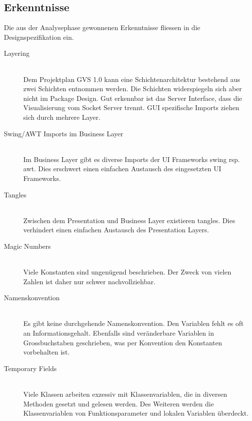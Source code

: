 \documentclass[11pt,a4paper,english,oneside]{book}
\numberwithin{equation}{chapter}
\begin{document}
	\clearpage
	
	\subsection{Erkenntnisse} \label{sec:erkenntnisse}
	Die aus der Analysephase gewonnenen Erkenntnisse fliessen in die Designspezifikation ein.
		
	\begin{description}
	\item[Layering] \hfill \\
	Dem Projektplan GVS 1.0 \cite{gvs1} kann eine Schichtenarchitektur bestehend aus zwei Schichten entnommen werden. Die Schichten widerspiegeln sich aber nicht im Package Design. Gut erkennbar ist das Server Interface, dass die Visualisierung vom Socket Server trennt. GUI spezifische Imports ziehen sich durch mehrere Layer.
	
	\item[Swing/AWT Imports im Business Layer] \hfill \\ \label{sssec:swing-business}
	Im Business Layer gibt es diverse Imports der UI Frameworks \gls{swing} rsp. \gls{awt}. Dies erschwert einen einfachen Austausch des eingesetzten UI Frameworks.
	
	\item[Tangles] \hfill \\
	Zwischen dem Presentation und Business Layer existieren \glspl{tangle}. Dies verhindert einen einfachen Austausch des Presentation Layers. 
	
	\item[Magic Numbers] \hfill \\
	Viele Konstanten sind ungenügend beschrieben. Der Zweck von vielen Zahlen ist daher nur schwer nachvollziehbar.
	
	\item[Namenskonvention] \hfill \\
	Es gibt keine durchgehende Namenskonvention. Den Variablen fehlt es oft an Informationsgehalt. Ebenfalls sind veränderbare Variablen in Grossbuchstaben geschrieben, was per Konvention \cite{jls-naming} den Konstanten vorbehalten ist.
	
	\item[Temporary Fields] \hfill \\
	Viele Klassen arbeiten exzessiv mit Klassenvariablen, die in diversen Methoden gesetzt und gelesen werden. Des Weiteren werden die Klassenvariablen von Funktionsparameter und lokalen Variablen überdeckt.   
	

\end{description}
\end{document}
